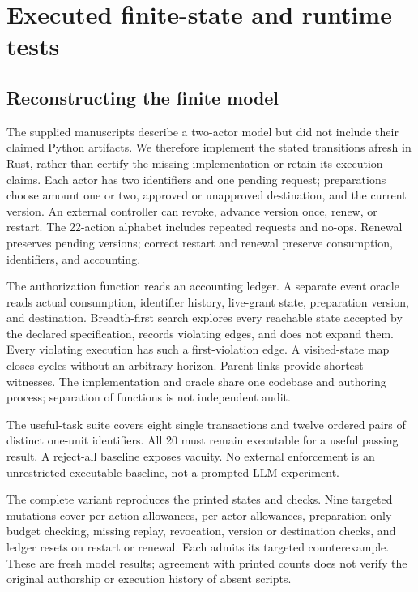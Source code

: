 \section{Executed finite-state and runtime tests}
\label{sec:experiment}

\subsection{Reconstructing the finite model}
The supplied manuscripts describe a two-actor model but did not include their claimed Python artifacts. We therefore implement the stated transitions afresh in Rust, rather than certify the missing implementation or retain its execution claims. Each actor has two identifiers and one pending request; preparations choose amount one or two, approved or unapproved destination, and the current version. An external controller can revoke, advance version once, renew, or restart. The 22-action alphabet includes repeated requests and no-ops. Renewal preserves pending versions; correct restart and renewal preserve consumption, identifiers, and accounting.

The authorization function reads an accounting ledger. A separate event oracle reads actual consumption, identifier history, live-grant state, preparation version, and destination. Breadth-first search explores every reachable state accepted by the declared specification, records violating edges, and does not expand them. Every violating execution has such a first-violation edge. A visited-state map closes cycles without an arbitrary horizon. Parent links provide shortest witnesses. The implementation and oracle share one codebase and authoring process; separation of functions is not independent audit.

The useful-task suite covers eight single transactions and twelve ordered pairs of distinct one-unit identifiers. All 20 must remain executable for a useful passing result. A reject-all baseline exposes vacuity. No external enforcement is an unrestricted executable baseline, not a prompted-LLM experiment.



The complete variant reproduces the printed \CheckedStates{} states and \CheckedEdges{} checks. Nine targeted mutations cover per-action allowances, per-actor allowances, preparation-only budget checking, missing replay, revocation, version or destination checks, and ledger resets on restart or renewal. Each admits its targeted counterexample. These are fresh model results; agreement with printed counts does not verify the original authorship or execution history of absent scripts.

